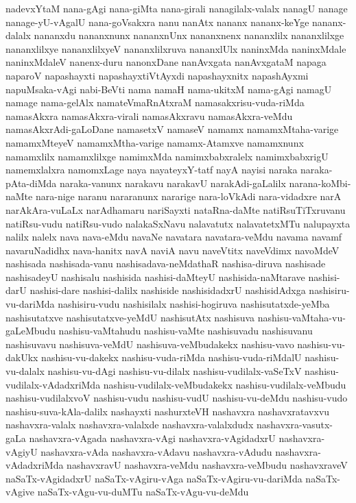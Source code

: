 {nadevxYtaM
nana-gAgi
nana-giMta
nana-girali
nanagilalx-valalx
nanagU
nanage
nanage-yU-vAgalU
nana-goVsakxra
nanu
nanAtx
nananx
nananx-keYge
nananx-dalalx
nananxdu
nananxnunx
nananxnUnx
nananxnenx
nananxlilx
nananxlilxge
nananxlilxye
nananxlilxyeV
nananxlilxruva
nananxlUlx
naninxMda
naninxMdale
naninxMdaleV
nanenx-duru
nanonxDane
nanAvxgata
nanAvxgataM
napaga
naparoV
napashayxti
napashayxtiVtAyxdi
napashayxnitx
napashAyxmi
napuMsaka-vAgi
nabi-BeVti
nama
namaH
nama-ukitxM
nama-gAgi
namagU
namage
nama-gelAlx
namateVmaRnAtxraM
namasakxrisu-vuda-riMda
namasAkxra
namasAkxra-virali
namasAkxravu
namasAkxra-veMdu
namasAkxrAdi-gaLoDane
namasetxV
namaseV
namamx
namamxMtaha-varige
namamxMteyeV
namamxMtha-varige
namamx-Atamxve
namamxnunx
namamxlilx
namamxlilxge
namimxMda
namimxbabxralelx
namimxbabxrigU
namemxlalxra
namomxLage
naya
nayateyxY-tatf
nayA
nayisi
naraka
naraka-pAta-diMda
naraka-vanunx
narakavu
narakavU
narakAdi-gaLalilx
narana-koMbi-naMte
nara-nige
naranu
nararanunx
nararige
nara-loVkAdi
nara-vidadxre
narA
narAkAra-vuLaLx
narAdhamaru
nariSayxti
nataRna-daMte
natiRsuTiTxruvanu
natiRsu-vudu
natiRsu-vudo
nalakaSxNavu
nalavatutx
nalavatetxMTu
nalupayxta
nalilx
nalelx
nava
nava-eMdu
navaNe
navatara
navatara-veMdu
navama
navamf
navaruNadidhx
nava-hanitx
navA
naviA
navu
naveVtitx
naveVdimx
navoMdeV
nashisada
nashisada-vanu
nashisadava-neMdathaR
nashisa-diruva
nashisade
nashisadeyU
nashisalu
nashisida
nashisi-daMteyU
nashisida-naMtarave
nashisi-darU
nashisi-dare
nashisi-dalilx
nashiside
nashisidadxrU
nashisidAdxga
nashisiru-vu-dariMda
nashisiru-vudu
nashisilalx
nashisi-hogiruva
nashisutatxde-yeMba
nashisutatxve
nashisutatxve-yeMdU
nashisutAtx
nashisuva
nashisu-vaMtaha-vu-gaLeMbudu
nashisu-vaMtahudu
nashisu-vaMte
nashisuvadu
nashisuvanu
nashisuvavu
nashisuva-veMdU
nashisuva-veMbudakekx
nashisu-vavo
nashisu-vu-dakUkx
nashisu-vu-dakekx
nashisu-vuda-riMda
nashisu-vuda-riMdalU
nashisu-vu-dalalx
nashisu-vu-dAgi
nashisu-vu-dilalx
nashisu-vudilalx-vaSeTxV
nashisu-vudilalx-vAdadxriMda
nashisu-vudilalx-veMbudakekx
nashisu-vudilalx-veMbudu
nashisu-vudilalxvoV
nashisu-vudu
nashisu-vudU
nashisu-vu-deMdu
nashisu-vudo
nashisu-suva-kAla-dalilx
nashayxti
nashurxteVH
nashavxra
nashavxratavxvu
nashavxra-valalx
nashavxra-valalxde
nashavxra-valalxdudx
nashavxra-vasutx-gaLa
nashavxra-vAgada
nashavxra-vAgi
nashavxra-vAgidadxrU
nashavxra-vAgiyU
nashavxra-vAda
nashavxra-vAdavu
nashavxra-vAdudu
nashavxra-vAdadxriMda
nashavxravU
nashavxra-veMdu
nashavxra-veMbudu
nashavxraveV
naSaTx-vAgidadxrU
naSaTx-vAgiru-vAga
naSaTx-vAgiru-vu-dariMda
naSaTx-vAgive
naSaTx-vAgu-vu-duMTu
naSaTx-vAgu-vu-deMdu
}
